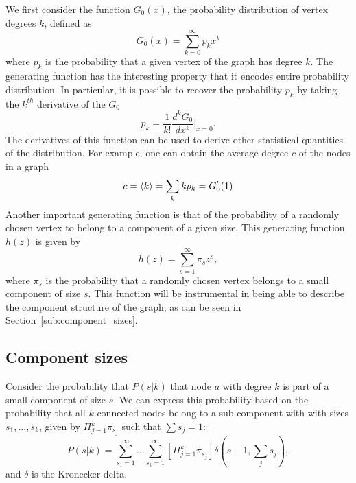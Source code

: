 We first consider the function $G_0(x)$, the probability distribution of vertex degrees $k$, defined as
\begin{equation}
G_0(x) = \sum_{k=0}^{\infty} p_k x^k
\end{equation}
where $p_k$ is the probability that a given vertex of the graph has degree $k$.
The generating function has the interesting property that it encodes entire probability distribution.
In particular, it is possible to recover the probability $p_k$ by taking the $k^{th}$ derivative of the $G_0$
\begin{equation}
	p_k = \frac{1}{k!} \frac{d^k G_0}{dx^k} \Big|_{x=0}.
\end{equation}
The derivatives of this function can be used to derive other statistical quantities of the distribution.
For example, one can obtain the average degree $c$ of the nodes in a graph
\begin{equation}
	c = \left< k \right> = \sum_k k p_k = G'_0(1)
\end{equation}
Another important generating function is that of the probability of a randomly chosen vertex to belong to a component of a given size.
This generating function $h(z)$ is given by
\begin{equation}
    \label{eq:gen_func_comp_sizes}
	h(z) = \sum_{s=1}^{\infty} \pi_s z^s,
\end{equation}
\noindent where $\pi_s$ is the probability that a randomly chosen vertex belongs to a small component of size $s$.
This function will be instrumental in being able to describe the component structure of the graph, as can be seen in Section~\vref{sub:component_sizes}.

\subsection{Component sizes} %
\label{sub:component_sizes}

Consider the probability that $P(s|k)$ that node $a$ with degree $k$ is part of a small component of size $s$.
We can express this probability based on the probability that all $k$ connected nodes belong to a sub-component with with sizes $s_1, \ldots, s_k$, given by $\Pi_{j=1}^{k} \pi_{s_j}$ such that $\sum s_j = 1$:
\begin{equation}
	P(s|k) = \sum_{s_1 = 1}^{\infty} \ldots \sum_{s_k = 1}^{\infty} \left[ \Pi_{j=1}^k \pi_{s_j} \right] \delta(s-1, \sum_j s_j),
\end{equation}
and $\delta$ is the Kronecker delta.

